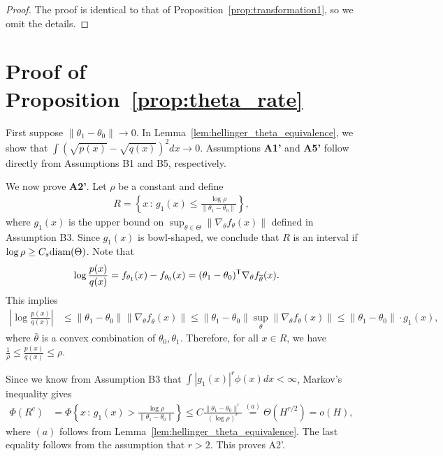 \documentclass{article}
\begin{document}
\begin{proof}
The proof is identical to that of Proposition~\ref{prop:transformation1}, so we omit the details.
\end{proof}


\section{Proof of Proposition~\ref{prop:theta_rate}}
\label{sec:theta_rate_proof}


First suppose $\| \theta_1 - \theta_0 \| \rightarrow 0$. In Lemma~\ref{lem:hellinger_theta_equivalence}, we show that $\int (\sqrt{p(x)} - \sqrt{q(x)})^2 dx \rightarrow 0$. Assumptions \textbf{A1'} and \textbf{A5'} follow directly from Assumptions B1 and B5, respectively. 

We now prove \textbf{A2'}. Let $\rho$ be a constant and define 
\begin{align}
R = \left\{ x \,:\, g_1(x) 
      \leq \frac{\log \rho}{\| \theta_1 - \theta_0 \|} \right\}, \label{eqn:parametric_R_defn}
\end{align}
where $g_1(x)$ is the upper bound on $\sup_{\theta \in \Theta} \| \nabla_\theta f_\theta(x) \|$ defined in Assumption B3. Since $g_1(x)$ is bowl-shaped, we conclude that $R$ is an interval if $\log \rho \geq C_s \textrm{diam}(\Theta)$. Note that
\begin{align*}
\log \frac{p(x)}{q(x)} &= f_{\theta_1}(x) - f_{\theta_0}(x) = (\theta_1 - \theta_0)^{\mathsf{T}} \nabla_{\theta} f_{\overline{\theta}} (x).
\end{align*}
This implies 
\begin{align*}
\left | \log \frac{p(x)}{q(x)} \right | &\leq \| \theta_1 - \theta_0 \| \| \nabla_{\theta} f_{\bar{\theta}} (x) \| \leq  \| \theta_1 - \theta_0 \| \sup_\theta \| \nabla_{\theta} f_{\theta} (x) \| \le \|\theta_1 - \theta_0\| \cdot g_1(x),
\end{align*}
where $\bar{\theta}$ is a convex combination of $\theta_0, \theta_1$. Therefore, for all $ x \in R$, we have $\frac{1}{\rho} \leq \frac{p(x)}{q(x)} \leq \rho$.

Since we know from Assumption B3 that $\int |g_1(x)|^r \phi(x) dx < \infty$, Markov's inequality gives
\begin{align*}
\Phi(R^c) &= \Phi \left\{ x \,:\, g_1(x) 
    > \frac{\log \rho}{\| \theta_1 - \theta_0 \|} \right\} 
    \leq C \frac{\| \theta_1 - \theta_0 \|^{r}}{(\log \rho)^{r}} 
    \stackrel{(a)}= \Theta( H^{r/2} ) = o(H),
\end{align*}
where $(a)$ follows from Lemma~\ref{lem:hellinger_theta_equivalence}. The last equality follows from the assumption that $r > 2$. This proves A2'.
\end{document}

